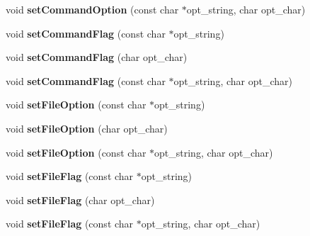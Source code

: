 \begin{DoxyCompactItemize}
\item 
\hypertarget{class_any_option_a232adbe285778b7b1745ebb419bfbced}{void {\bfseries set\-Command\-Option} (const char $\ast$opt\-\_\-string, char opt\-\_\-char)}\label{class_any_option_a232adbe285778b7b1745ebb419bfbced}

\item 
\hypertarget{class_any_option_ab84fbc729395adf0f0989c578a388934}{void {\bfseries set\-Command\-Flag} (const char $\ast$opt\-\_\-string)}\label{class_any_option_ab84fbc729395adf0f0989c578a388934}

\item 
\hypertarget{class_any_option_a226781e167bfa77a3c57e7207a0406b9}{void {\bfseries set\-Command\-Flag} (char opt\-\_\-char)}\label{class_any_option_a226781e167bfa77a3c57e7207a0406b9}

\item 
\hypertarget{class_any_option_ad7720617bda6fb5519d195989c8605f2}{void {\bfseries set\-Command\-Flag} (const char $\ast$opt\-\_\-string, char opt\-\_\-char)}\label{class_any_option_ad7720617bda6fb5519d195989c8605f2}

\item 
\hypertarget{class_any_option_a4eeaaf6a433ae7d0724243581436914b}{void {\bfseries set\-File\-Option} (const char $\ast$opt\-\_\-string)}\label{class_any_option_a4eeaaf6a433ae7d0724243581436914b}

\item 
\hypertarget{class_any_option_a700d49a1544d37247d9a29bf89f7602b}{void {\bfseries set\-File\-Option} (char opt\-\_\-char)}\label{class_any_option_a700d49a1544d37247d9a29bf89f7602b}

\item 
\hypertarget{class_any_option_a0f0790f91a6bbdba445e8d613c4b1e2d}{void {\bfseries set\-File\-Option} (const char $\ast$opt\-\_\-string, char opt\-\_\-char)}\label{class_any_option_a0f0790f91a6bbdba445e8d613c4b1e2d}

\item 
\hypertarget{class_any_option_a58332626754ef69f750f2583f7b72a72}{void {\bfseries set\-File\-Flag} (const char $\ast$opt\-\_\-string)}\label{class_any_option_a58332626754ef69f750f2583f7b72a72}

\item 
\hypertarget{class_any_option_a19dad4072d02832b2d86b20f6c11c117}{void {\bfseries set\-File\-Flag} (char opt\-\_\-char)}\label{class_any_option_a19dad4072d02832b2d86b20f6c11c117}

\item 
\hypertarget{class_any_option_a8fa052e644d8b04b7bd95bda48c16cf8}{void {\bfseries set\-File\-Flag} (const char $\ast$opt\-\_\-string, char opt\-\_\-char)}\label{class_any_option_a8fa052e644d8b04b7bd95bda48c16cf8}


\end{DoxyCompactItemize}
